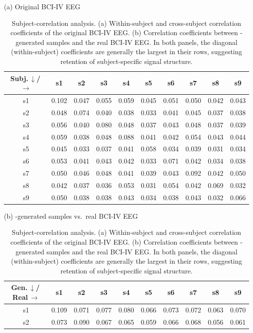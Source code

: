 \begin{table}[t]
  \caption{Subject-correlation analysis. (a) Within-subject and cross-subject
  correlation coefficients of the original BCI-IV EEG. (b) Correlation
  coefficients between \saddpm{}-generated samples and the real BCI-IV EEG. In
  both panels, the diagonal (within-subject) coefficients are generally the
  largest in their rows, suggesting retention of subject-specific signal
  structure.}
  \label{tab:corr}
  \footnotesize
  \setlength{\tabcolsep}{5pt}
  \centering
  \par\smallskip
  (a) Original BCI-IV EEG\par\smallskip
  \begin{tabular}{c*{9}{c}}
    \toprule
    Subj.\,$\downarrow$/\,$\rightarrow$ & s1 & s2 & s3 & s4 & s5 & s6 & s7 & s8 & s9 \\
    \midrule
    s1 & 0.102 & 0.047 & 0.055 & 0.059 & 0.045 & 0.051 & 0.050 & 0.042 & 0.043 \\
    s2 & 0.048 & 0.074 & 0.040 & 0.038 & 0.033 & 0.041 & 0.045 & 0.037 & 0.038 \\
    s3 & 0.056 & 0.040 & 0.080 & 0.048 & 0.037 & 0.043 & 0.048 & 0.037 & 0.039 \\
    s4 & 0.059 & 0.038 & 0.048 & 0.088 & 0.041 & 0.042 & 0.054 & 0.043 & 0.044 \\
    s5 & 0.045 & 0.033 & 0.037 & 0.041 & 0.058 & 0.034 & 0.039 & 0.031 & 0.034 \\
    s6 & 0.053 & 0.041 & 0.043 & 0.042 & 0.033 & 0.071 & 0.042 & 0.034 & 0.038 \\
    s7 & 0.050 & 0.046 & 0.048 & 0.041 & 0.039 & 0.043 & 0.092 & 0.042 & 0.050 \\
    s8 & 0.042 & 0.037 & 0.036 & 0.053 & 0.031 & 0.054 & 0.042 & 0.069 & 0.032 \\
    s9 & 0.050 & 0.038 & 0.038 & 0.043 & 0.034 & 0.038 & 0.043 & 0.032 & 0.066 \\
    \bottomrule
  \end{tabular}
  \par\medskip
  (b) \saddpm{}-generated samples vs.\ real BCI-IV EEG\par\smallskip
  \begin{tabular}{c*{9}{c}}
    \toprule
    Gen.\,$\downarrow$/\,Real\,$\rightarrow$ & s1 & s2 & s3 & s4 & s5 & s6 & s7 & s8 & s9 \\
    \midrule
    s1 & 0.109 & 0.071 & 0.077 & 0.080 & 0.066 & 0.073 & 0.072 & 0.063 & 0.070 \\
    s2 & 0.073 & 0.090 & 0.067 & 0.065 & 0.059 & 0.066 & 0.068 & 0.056 & 0.061 \\

\end{tabular}
\end{table}
